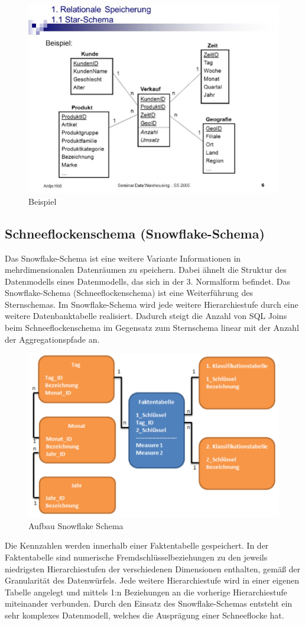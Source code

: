 \begin{figure}[H]
    \centering
    \includegraphics[width=.4\textwidth]{Content/images/modellierung/star2.png}
    \caption{Beispiel}
    \label{fig:modellierung:star2}
\end{figure}

\subsection{Schneeflockenschema (Snowflake-Schema)}

Das Snowflake-Schema ist eine weitere Variante Informationen in mehrdimensionalen Datenräumen zu speichern. Dabei ähnelt die Struktur des Datenmodells eines Datenmodells, das sich in der 3. Normalform befindet.
Das Snowflake-Schema (Schneeflockenschema) ist eine Weiterführung des Sternschemas. Im Snowflake-Schema wird jede weitere Hierarchiestufe durch eine weitere Datenbanktabelle realisiert.
Dadurch steigt die Anzahl von SQL Joins beim Schneeflockenschema im Gegensatz zum Sternschema linear mit der Anzahl der Aggregationspfade an.

\begin{figure}[H]
    \centering
    \includegraphics[width=.4\textwidth]{Content/images/modellierung/snow.png}
    \caption{Aufbau Snowflake Schema}
    \label{fig:modellierung:snow}
\end{figure}

Die Kennzahlen werden innerhalb einer Faktentabelle gespeichert. In der Faktentabelle sind numerische Fremdschlüsselbeziehungen zu den jeweils niedrigsten Hierarchiestufen der verschiedenen Dimensionen enthalten, gemäß der Granularität des Datenwürfels.
Jede weitere Hierarchiestufe wird in einer eigenen Tabelle angelegt und mittels 1:n Beziehungen an die vorherige Hierarchiestufe miteinander verbunden. Durch den Einsatz des Snowflake-Schemas entsteht ein sehr komplexes Datenmodell, welches die Ausprägung einer Schneeflocke hat.

